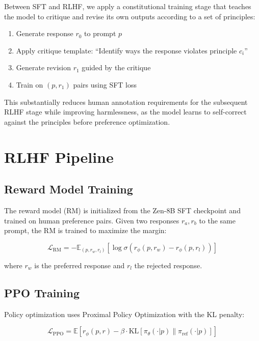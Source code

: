 \documentclass[11pt,a4paper]{article}
\begin{document}
Between SFT and RLHF, we apply a constitutional training stage that teaches the model
to critique and revise its own outputs according to a set of principles:

\begin{enumerate}
  \item Generate response $r_0$ to prompt $p$
  \item Apply critique template: ``Identify ways the response violates principle $c_i$''
  \item Generate revision $r_1$ guided by the critique
  \item Train on $(p, r_1)$ pairs using SFT loss
\end{enumerate}

This substantially reduces human annotation requirements for the subsequent RLHF stage
while improving harmlessness, as the model learns to self-correct against the principles
before preference optimization.

\section{RLHF Pipeline}

\subsection{Reward Model Training}

The reward model (RM) is initialized from the Zen-8B SFT checkpoint and trained on
human preference pairs. Given two responses $r_a, r_b$ to the same prompt,
the RM is trained to maximize the margin:

\begin{equation}
\mathcal{L}_\text{RM} = -\mathbb{E}_{(p,r_w,r_l)} \left[\log \sigma\left(r_\phi(p, r_w) - r_\phi(p, r_l)\right)\right]
\end{equation}

where $r_w$ is the preferred response and $r_l$ the rejected response.

\subsection{PPO Training}

Policy optimization uses Proximal Policy Optimization with the KL penalty:

\begin{equation}
\mathcal{L}_\text{PPO} = \mathbb{E}\left[r_\phi(p, r) - \beta \cdot \text{KL}\left[\pi_\theta(\cdot|p) \| \pi_{\text{ref}}(\cdot|p)\right]\right]
\end{equation}
\end{document}
